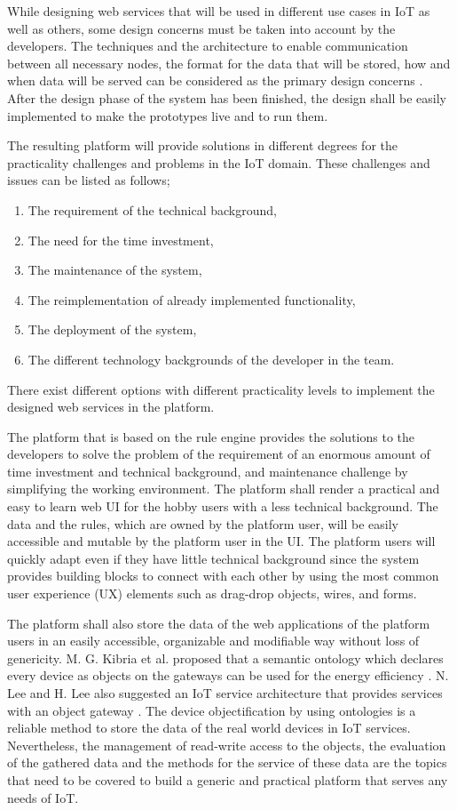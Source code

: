 While designing web services that will be used in different use cases in IoT as well as others, some design concerns must be taken into account by the developers. The techniques and the architecture to enable communication between all necessary nodes, the format for the data that will be stored, how and when data will be served can be considered as the primary design concerns \cite{6651222}. After the design phase of the system has been finished, the design shall be easily implemented to make the prototypes live and to run them. 

The resulting platform will provide solutions in different degrees for the practicality challenges and problems in the IoT domain. These challenges and issues can be listed as follows;

\begin{enumerate}
    \item The requirement of the technical background,
    \item The need for the time investment,
    \item The maintenance of the system,
    \item The reimplementation of already implemented functionality,
    \item The deployment of the system,
    \item The different technology backgrounds of the developer in the team.
\end{enumerate}

There exist different options with different practicality levels to implement the designed web services in the platform. 

The platform that is based on the rule engine provides the solutions to the developers to solve the problem of the requirement of an enormous amount of time investment and technical background, and maintenance challenge by simplifying the working environment. The platform shall render a practical and easy to learn web UI for the hobby users with a less technical background. The data and the rules, which are owned by the platform user, will be easily accessible and mutable by the platform user in the UI. The platform users will quickly adapt even if they have little technical background since the system provides building blocks to connect with each other by using the most common user experience (UX) elements such as drag-drop objects, wires, and forms. 

The platform shall also store the data of the web applications of the platform users in an easily accessible, organizable and modifiable way without loss of genericity. M. G. Kibria et al. proposed that a semantic ontology which declares every device as objects on the gateways can be used for the energy efficiency \cite{7993747}. N. Lee and H. Lee also suggested an IoT service architecture that provides services with an object gateway \cite{6884496}. The device objectification by using ontologies is a reliable method to store the data of the real world devices in IoT services. Nevertheless, the management of read-write access to the objects, the evaluation of the gathered data and the methods for the service of these data are the topics that need to be covered to build a generic and practical platform that serves any needs of IoT.

